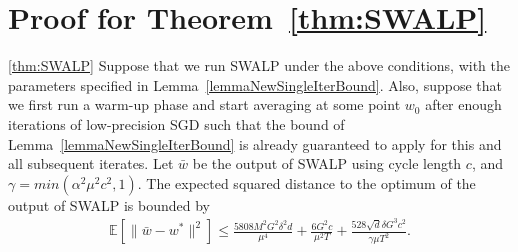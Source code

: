 
\section{Proof for Theorem~\ref{thm:SWALP}}\label{sec:thm4.3}

\begin{customthm}{\ref{thm:SWALP}}
Suppose that we run SWALP under the above conditions, with the parameters specified in Lemma~\ref{lemmaNewSingleIterBound}.
Also, suppose that we first run a warm-up phase and start averaging at some point $w_0$ after enough iterations of low-precision SGD such that the bound of Lemma~\ref{lemmaNewSingleIterBound} is already guaranteed to apply for this and all subsequent iterates.
Let $\bar{w}$ be the output of SWALP using cycle length $c$, and $\gamma = min(\alpha^2\mu^2c^2,1)$.
The expected squared distance to the optimum of the output of SWALP is bounded by
\begin{align*}
    \mathbb{E}[\|\bar{w} - w^*\|^2] \leq
    \frac{5808 M^2G^2\delta^2 d}{\mu^4} + 
    \frac{6 G^2 c}{\mu^2 T} +
    \frac{528 \sqrt{d}\delta G^3 c^2}{\gamma\mu T^2}.
\end{align*}
\end{customthm}


